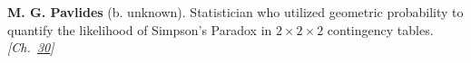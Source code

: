 \textbf{M. G. Pavlides} (b. unknown). Statistician who utilized geometric probability to quantify the likelihood of Simpson's Paradox in $2 \times 2 \times 2$ contingency tables. \emph{[Ch.~\hyperref[ch:simpsonsparadox]{30}]}

